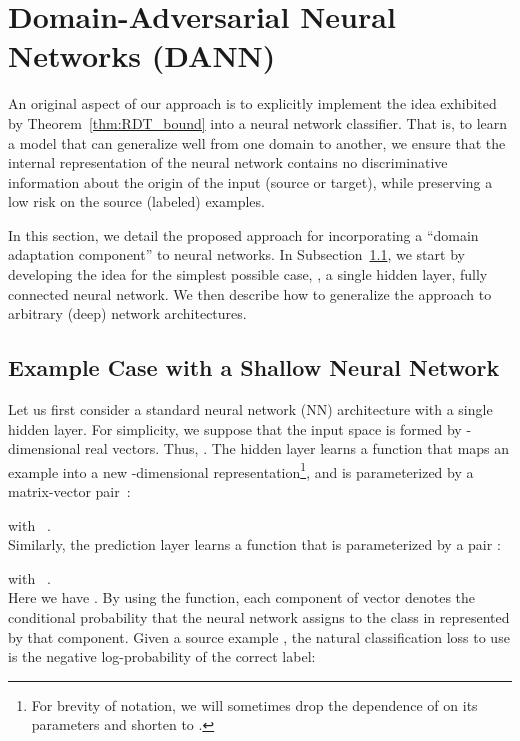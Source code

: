 \documentclass[twoside,11pt]{article}
\begin{document}
\section{Domain-Adversarial Neural Networks (DANN)}
\label{section:dann}

An original aspect of our approach is to explicitly implement the idea exhibited by Theorem~\ref{thm:RDT_bound} 
into a neural network classifier.
That is,  to learn a
model that can generalize well from one domain to another, we ensure that
the internal representation of the neural network contains no discriminative information about the origin of the input (source or target), while preserving a low risk on the source (labeled) examples.

In this section, we detail the proposed approach for incorporating a ``domain adaptation component'' to neural networks.
In Subsection~\ref{section:shallow_dann}, we start by developing the idea for the simplest possible case, \ie,  a single hidden layer, fully connected neural network. We then describe how to generalize the approach to arbitrary  (deep) network architectures. 

\subsection{Example Case with a Shallow Neural Network}
\label{section:shallow_dann}

Let us first consider a standard neural network (NN) architecture with a single hidden layer. For simplicity, we suppose that the input space is formed by -dimensional real vectors. Thus, . The hidden layer  learns a function  that maps an example into a new -dimensional representation\footnote{For brevity of notation, we will sometimes drop the dependence of  on its parameters  
and shorten  to .}, and is parameterized by a matrix-vector pair \,: 

with \ .\\

Similarly, the prediction layer  learns a function  that is parameterized by a pair 
:

with \ .\\

Here we have . By using the  function, each component of vector  denotes the conditional probability that the neural network assigns  to the class in  represented by that component. 
Given a source example , the natural classification loss to use is the negative log-probability of the correct label:
\end{document}
